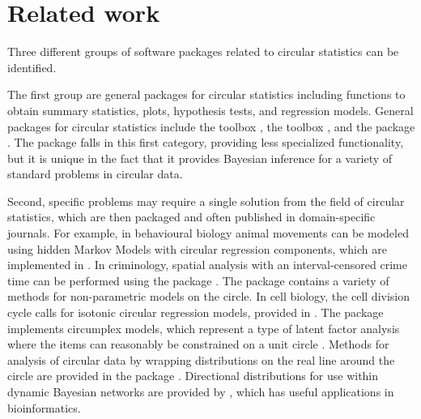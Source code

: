 \hypertarget{related-work}{%
\section{Related work}\label{related-work}}

\label{relatedwork}

Three different groups of software packages related to circular
statistics can be identified.

The first group are general packages for circular statistics including
functions to obtain summary statistics, plots, hypothesis tests, and
regression models. General packages for circular statistics include the
 toolbox  \citep{cox1998circstat}, the
 toolbox  \citep{berens2009circstat},
and the  package  \citep{lund2013package}. The
package  falls in this first category, providing less
specialized functionality, but it is unique in the fact that it provides
Bayesian inference for a variety of standard problems in circular data.

Second, specific problems may require a single solution from the field
of circular statistics, which are then packaged and often published in
domain-specific journals. For example, in behavioural biology animal
movements can be modeled using hidden Markov Models with circular
regression components, which are implemented in 
\citep{mcclintock2018momentuhmm}. In criminology, spatial analysis with
an interval-censored crime time can be performed using the package
 \citep{kikuchi2015package}. The package 
\citep{JSSv061i09} contains a variety of methods for non-parametric
models on the circle. In cell biology, the cell division cycle calls for
isotonic circular regression models, provided in 
\citep{barragan2013isocir}. The  package 
\citep{grassi2010circe} implements circumplex models, which represent a
type of latent factor analysis where the items can reasonably be
constrained on a unit circle \citep{browne1992circumplex}. Methods for
analysis of circular data by wrapping distributions on the real line
around the circle are provided in the  package 
\citep{nadarajah2017wrapped}. Directional distributions for use within
dynamic Bayesian networks are provided by 
\citep{paluszewski2010mocapy}, which has useful applications in
bioinformatics.

